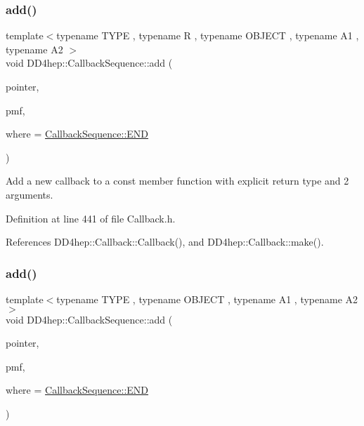 \subsubsection{\texorpdfstring{add()}{add()}\hspace{0.1cm}{\footnotesize\ttfamily [11/13]}}
{\footnotesize\ttfamily template$<$typename T\+Y\+PE , typename R , typename O\+B\+J\+E\+CT , typename A1 , typename A2 $>$ \\
void D\+D4hep\+::\+Callback\+Sequence\+::add (\begin{DoxyParamCaption}\item[{T\+Y\+PE $\ast$}]{pointer,  }\item[{R(O\+B\+J\+E\+C\+T\+::$\ast$)(A1, A2) const}]{pmf,  }\item[{\hyperlink{struct_d_d4hep_1_1_callback_sequence_a7753490247479633aed16a2376821ef7}{Location}}]{where = {\ttfamily \hyperlink{struct_d_d4hep_1_1_callback_sequence_a7753490247479633aed16a2376821ef7ac39eeb1bcfc1c235ab1d0d9315c310ac}{Callback\+Sequence\+::\+E\+ND}} }\end{DoxyParamCaption})\hspace{0.3cm}{\ttfamily [inline]}}



Add a new callback to a const member function with explicit return type and 2 arguments. 



Definition at line 441 of file Callback.\+h.



References D\+D4hep\+::\+Callback\+::\+Callback(), and D\+D4hep\+::\+Callback\+::make().

\hypertarget{struct_d_d4hep_1_1_callback_sequence_af301b28e6378f2640e87591e7077409f}{}\label{struct_d_d4hep_1_1_callback_sequence_af301b28e6378f2640e87591e7077409f} 
\subsubsection{\texorpdfstring{add()}{add()}\hspace{0.1cm}{\footnotesize\ttfamily [12/13]}}
{\footnotesize\ttfamily template$<$typename T\+Y\+PE , typename O\+B\+J\+E\+CT , typename A1 , typename A2 $>$ \\
void D\+D4hep\+::\+Callback\+Sequence\+::add (\begin{DoxyParamCaption}\item[{T\+Y\+PE $\ast$}]{pointer,  }\item[{void(O\+B\+J\+E\+C\+T\+::$\ast$)(A1, A2)}]{pmf,  }\item[{\hyperlink{struct_d_d4hep_1_1_callback_sequence_a7753490247479633aed16a2376821ef7}{Location}}]{where = {\ttfamily \hyperlink{struct_d_d4hep_1_1_callback_sequence_a7753490247479633aed16a2376821ef7ac39eeb1bcfc1c235ab1d0d9315c310ac}{Callback\+Sequence\+::\+E\+ND}} }\end{DoxyParamCaption})\hspace{0.3cm}{\ttfamily [inline]}}



